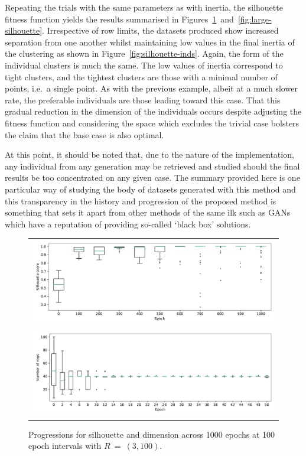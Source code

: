 \documentclass[smallextended]{svjour3}
\newlength{\imgwidth}
\begin{document}
Repeating the trials with the same parameters as with inertia, the silhouette
fitness function yields the results summarised in
Figures~\ref{fig:small-silhouette}~and~\ref{fig:large-silhouette}. Irrespective
of row limits, the datasets produced show increased separation from one another
whilst maintaining low values in the final inertia of the clustering as shown in
Figure~\ref{fig:silhouette-inds}. Again, the form of the individual clusters is
much the same. The low values of inertia correspond to tight clusters, and the
tightest clusters are those with a minimal number of points, i.e.\ a single
point. As with the previous example, albeit at a much slower rate, the
preferable individuals are those leading toward this case. That this gradual
reduction in the dimension of the individuals occurs despite adjusting the
fitness function and considering the space which excludes the trivial case
bolsters the claim that the base case is also optimal.

At this point, it should be noted that, due to the nature of the implementation,
any individual from any generation may be retrieved and studied should the final
results be too concentrated on any given case. The summary provided here is one
particular way of studying the body of datasets generated with this method and
this transparency in the history and progression of the proposed method is
something that sets it apart from other methods of the same ilk such as GANs
which have a reputation of providing so-called `black box' solutions.

\addtocounter{figure}{1}
\begin{figure}[htbp]
    \ContinuedFloat%
    \centering
    \begin{tabular}{c}
        \includegraphics[width=\imgwidth]{Fig9a-1.pdf}
        \\
        \includegraphics[width=\imgwidth]{Fig9a-2.pdf}
    \end{tabular}
    \caption{%
        Progressions for silhouette and dimension across 1000 epochs at 100
        epoch intervals with \(R~=~(3, 100)\).
    }\label{fig:small-silhouette}
\end{figure}
\end{document}
